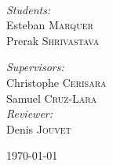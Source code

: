 \begin{titlepage}
\begin{center}
\HRule \\[1.5cm]

\vfill
\begin{minipage}{0.4\textwidth}
\begin{flushleft} \large
\emph{Students:}\\
Esteban \textsc{Marquer}\\
Prerak \textsc{Shrivastava}
\end{flushleft}
\end{minipage}
\begin{minipage}{0.4\textwidth}
\begin{flushright} \large
\emph{Supervisors:} \\
Christophe \textsc{Cerisara} \\
Samuel \textsc{Cruz-Lara} \\
\emph{Reviewer:} \\
Denis \textsc{Jouvet}
\end{flushright}
\end{minipage}

\vfill

{\large \today}

\end{center}
\end{titlepage}